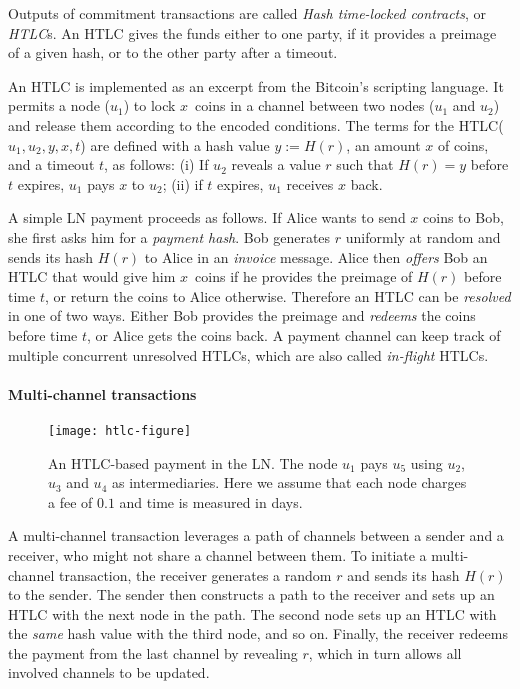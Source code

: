 Outputs of commitment transactions are called \textit{Hash time-locked contracts}, or \textit{HTLC}s.
An HTLC gives the funds either to one party, if it provides a preimage of a given hash, or to the other party after a timeout.

An HTLC is implemented as an excerpt from the Bitcoin's scripting language.
It permits a node ($u_1$) to lock $x$~coins in a channel between two nodes ($u_1$ and $u_2$) and release them according to the encoded conditions.
The terms for the HTLC($u_1, u_2, y, x, t$) are defined with a hash value $y := H(r)$, an amount $x$ of coins, and a timeout $t$, as follows: 
(i) If $u_2$ reveals a value $r$ such that $H(r) = y$ before $t$ expires, $u_1$ pays $x$ to $u_2$; 
(ii) if $t$ expires, $u_1$ receives $x$ back.

A simple LN payment proceeds as follows.
If Alice wants to send $x$ coins to Bob, she first asks him for a \textit{payment hash}.
Bob generates $r$ uniformly at random and sends its hash $H(r)$ to Alice in an \textit{invoice} message.
Alice then \textit{offers} Bob an HTLC that would give him $x$~coins if he provides the preimage of $H(r)$ before time $t$, or return the coins to Alice otherwise.
Therefore an HTLC can be \textit{resolved} in one of two ways.
Either Bob provides the preimage and \textit{redeems} the coins before time $t$, or Alice gets the coins back.
A payment channel can keep track of multiple concurrent unresolved HTLCs, which are also called \textit{in-flight} HTLCs.


\paragraph{Multi-channel transactions}

\begin{figure*}[h]
	\texttt{[image: htlc-figure]}
	\caption{An HTLC-based payment in the LN. The node $u_1$ pays $u_5$ using $u_2$, $u_3$ and $u_4$ as intermediaries. 
		Here we assume that each node charges a fee of $0.1$ and time is measured in days.}
	\label{fig:htlc}
\end{figure*}

A multi-channel transaction leverages a path of channels between a sender and a receiver, who might not share a channel between them.
To initiate a multi-channel transaction, the receiver generates a random $r$ and sends its hash $H(r)$ to the sender.
The sender then constructs a path to the receiver and sets up an HTLC with the next node in the path.
The second node sets up an HTLC with the \textit{same} hash value with the third node, and so on.
Finally, the receiver redeems the payment from the last channel by revealing $r$, which in turn allows all involved channels to be updated.

